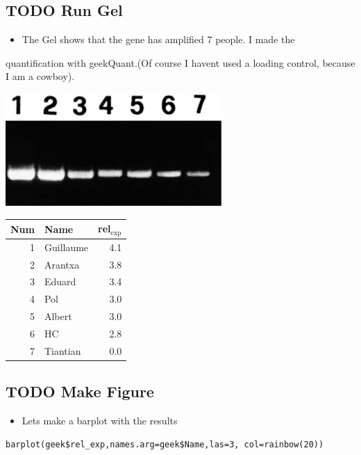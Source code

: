 \documentclass[11pt]{article}
\begin{document}
\subsection{{\bfseries\sffamily TODO} Run Gel}
\label{sec:org95ba535}
\begin{itemize}
\item The Gel shows that the gene has amplified 7 people. I made the
\end{itemize}
quantification with geekQuant.(Of course I havent used a loading control,
because I am a cowboy).

\begin{center}
\includegraphics[width=.9\linewidth]{gel.jpg}
\end{center}

\begin{center}
\label{tab:org4c52783}
\begin{tabular}{rlr}
Num & Name & rel\(_{\text{exp}}\)\\
\hline
1 & Guillaume & 4.1\\
2 & Arantxa & 3.8\\
3 & Eduard & 3.4\\
4 & Pol & 3.0\\
5 & Albert & 3.0\\
6 & HC & 2.8\\
7 & Tiantian & 0.0\\
\end{tabular}
\end{center}

\subsection{{\bfseries\sffamily TODO} Make Figure}
\label{sec:org7053296}

\begin{itemize}
\item Lets make a barplot with the results
\end{itemize}
\begin{verbatim}
barplot(geek$rel_exp,names.arg=geek$Name,las=3, col=rainbow(20))
\end{verbatim}
\end{document}
